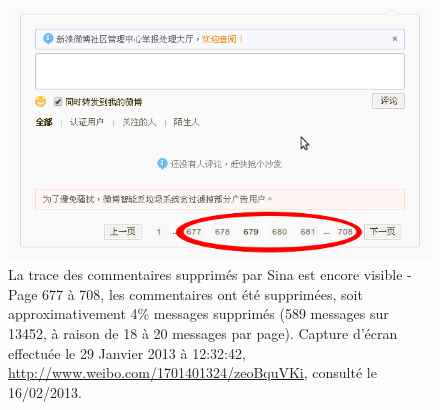\begin{figure}[htbp]
    \centering
    \includegraphics[scale=0.5]{figures/chap1/comments.png}
    \caption[Commentaires supprimés par Sina]{La trace des commentaires supprimés par Sina est encore visible - Page 677 à 708, les commentaires ont été supprimées, soit approximativement 4\% messages supprimés (589 messages sur 13452, à raison de 18 à 20 messages par page). Capture d’écran effectuée le 29 Janvier 2013 à 12:32:42, \url{http://www.weibo.com/1701401324/zeoBquVKi}, consulté le 16/02/2013.}
    \label{fig:comments}
\end{figure}

